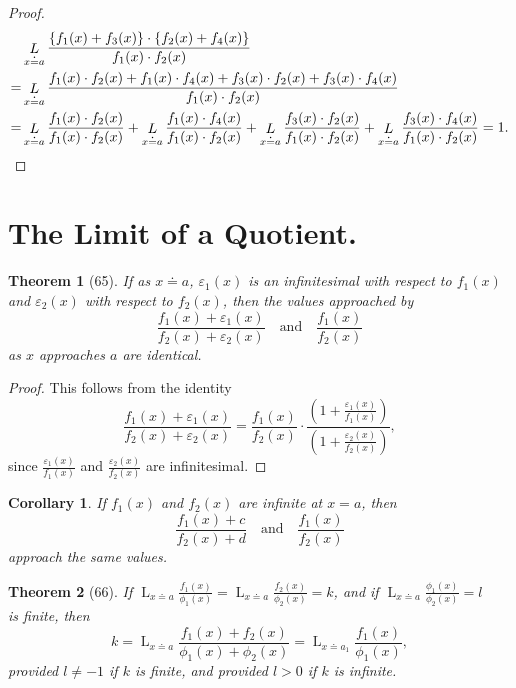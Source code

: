 \documentclass[a4paper,12pt]{book}[2004/02/16]
\providecommand{\colorbox}[2]{#2}
\newcommand{\correction}[2]{\colorbox{corr}{#1}}
\providecommand{\hypertarget}[2]{#2}
\theoremstyle{ilemma}
\theoremstyle{itheorem}
\newtheorem{theorem}{Theorem}
\theoremstyle{iother}
\theoremstyle{icorollary}
\newtheorem{corollary}{Corollary}
\theoremstyle{numcorollary}
\theoremstyle{idefinition}
\renewcommand{\dfrac}[2]{\frac{#1}{#2}}%
\begin{document}
\begin{proof}
\begin{align*}
  &\mathop{L}_{x \doteq a} \frac{\{f_1(x) + f_3(x)\} \cdot \{f_2(x) +
  f_4(x)\}}{f_1(x)\cdot f_2(x)} \\
  =&\mathop{L}_{x \doteq a} \frac{f_1(x)\cdot f_2(x) + f_1(x)\cdot
  f_4(x) + f_3(x)\cdot f_2(x) + f_3(x)\cdot f_4(x)}{f_1(x)\cdot
  f_2(x)} \\
  =&\mathop{L}_{x \doteq a} \frac{f_1(x)\cdot f_2(x)}{f_1(x)\cdot f_2(x)} +
  \mathop{L}_{x \doteq a} \frac{f_1(x)\cdot f_4(x)}{f_1(x)\cdot
  f_2(x)} + \mathop{L}_{x \doteq a} \frac{f_3(x) \cdot f_2(x)}
  {f_1(x)\cdot f_2(x)} + \mathop{L}_{x \doteq a} \frac{f_3(x) \cdot
  f_4(x)} {f_1(x)\cdot f_2(x)} = 1.\qedhere
\end{align*}
\end{proof}


\section{The Limit of a Quotient.}\hypertarget{chVIsec2}{}%

\begin{theorem}[65]\hypertarget{thm65}{}
If as $x \doteq a$, $\varepsilon_1(x)$ is an infinitesimal with
respect to $f_1(x)$ and $\varepsilon_2(x)$ with respect to $f_2(x)$,
then the values approached by
\[
  \frac{f_1(x) + \varepsilon_1(x)}{f_2(x) + \varepsilon_2(x)}
  \quad \text{and} \quad
  \frac{f_1(x)}{f_2(x)}
\]
as $x$ approaches $a$ are identical.
\end{theorem}

\begin{proof}
This follows from the identity
\[
  \frac{f_1(x) + \varepsilon_1(x)}{f_2(x) + \varepsilon_2(x)}
  = \frac{f_1(x)}{f_2(x)} \cdot
  \frac{\left(1 + \dfrac{\varepsilon_1(x)}{f_1(x)}\right)}%
  {\left(1 + \dfrac{\varepsilon_2(x)}{f_2(x)}\right)},
\]
\correction{since}{Since} $\dfrac{\varepsilon_1(x)}{f_1(x)} $ and
$\dfrac{\varepsilon_2(x)}{f_2(x)}$ are infinitesimal.
\end{proof}

\begin{corollary}
If $f_1(x)$ and $f_2(x)$ are infinite at $x=a$, then
\[
  \frac{f_1(x) + c} {f_2(x) + d} \quad
  \text{and} \quad \frac{f_1(x)}{f_2(x)}
\]
approach the same values.
\end{corollary}

\begin{theorem}[66]\hypertarget{thm66}{}
If $\displaystyle \mathop{L}_{x \doteq a} \dfrac{f_1(x)}{\phi_1(x)} =
\mathop{L}_{x \doteq a} \dfrac{f_2(x)}{\phi_2(x)} = k$, and if
$\displaystyle \mathop{L}_{x \doteq a} \frac{\phi_1(x)}{\phi_2(x)} =
l$\\ is finite, then
\[
  k = \mathop{L}_{x \doteq a}
  \frac{f_1(x) + f_2(x)}{\phi_1(x) + \phi_2(x)}
  = \mathop{L}_{x \doteq a_1} \frac{f_1(x)}{\phi_1(x)},
\]
provided $l \neq-1$ if $k$ is finite, and provided $l>0$ if $k$ is
infinite.
\end{theorem}
\end{document}
